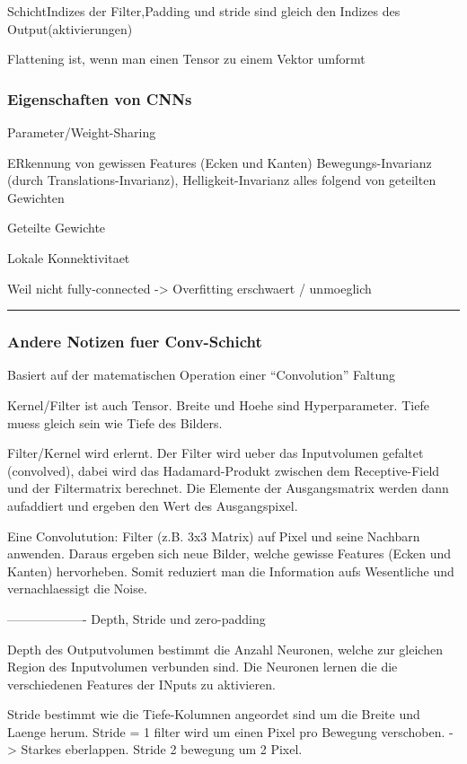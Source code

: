\documentclass[../main]{subfiles}
\begin{document}
SchichtIndizes der Filter,Padding und stride sind gleich den Indizes des Output(aktivierungen)


Flattening ist, wenn man einen Tensor zu einem Vektor umformt
\subsubsection{Eigenschaften von CNNs}
Parameter/Weight-Sharing

ERkennung von gewissen Features (Ecken und Kanten)
Bewegungs-Invarianz (durch Translations-Invarianz), Helligkeit-Invarianz
alles folgend von geteilten Gewichten

Geteilte Gewichte

Lokale Konnektivitaet

Weil nicht fully-connected -> Overfitting erschwaert / unmoeglich

\noindent\rule{\textwidth}{10pt}

\subsubsection{Andere Notizen fuer Conv-Schicht}
Basiert auf der matematischen Operation einer ``Convolution'' Faltung

Kernel/Filter ist auch Tensor. Breite und Hoehe sind Hyperparameter. Tiefe muess
gleich sein wie Tiefe des Bilders.

Filter/Kernel wird erlernt. Der Filter wird ueber das Inputvolumen gefaltet
(convolved), dabei wird das Hadamard-Produkt zwischen dem Receptive-Field und
der Filtermatrix berechnet. Die Elemente der Ausgangsmatrix werden dann
aufaddiert und ergeben den Wert des Ausgangspixel.

Eine Convolutution:
Filter (z.B. 3x3 Matrix) auf Pixel und seine Nachbarn anwenden.
Daraus ergeben sich neue Bilder, welche gewisse Features (Ecken und Kanten)
hervorheben.
Somit reduziert man die Information aufs Wesentliche und vernachlaessigt die Noise.



-------------------
Depth, Stride und zero-padding

Depth des Outputvolumen bestimmt die Anzahl Neuronen, welche zur gleichen Region
des Inputvolumen verbunden sind. Die Neuronen lernen die die verschiedenen
Features der INputs zu aktivieren.

Stride bestimmt wie die Tiefe-Kolumnen angeordet sind um die Breite und Laenge
herum. Stride = 1 filter wird um einen Pixel pro Bewegung verschoben. -> Starkes
eberlappen. Stride 2 bewegung um 2 Pixel.
\end{document}
